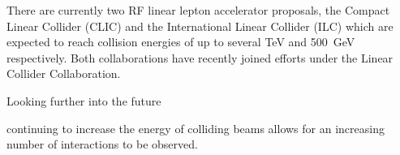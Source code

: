 
There are currently two RF linear lepton accelerator proposals, the Compact
Linear Collider (CLIC) and the International Linear Collider (ILC) which are
expected to reach collision energies of up to several \si{\tera\electronvolt}
and \SI{500}{\giga\electronvolt} respectively. Both collaborations have
recently joined efforts under the Linear Collider Collaboration.

Looking further into the future

continuing to increase the energy of colliding beams allows for an increasing
number of interactions to be observed.




